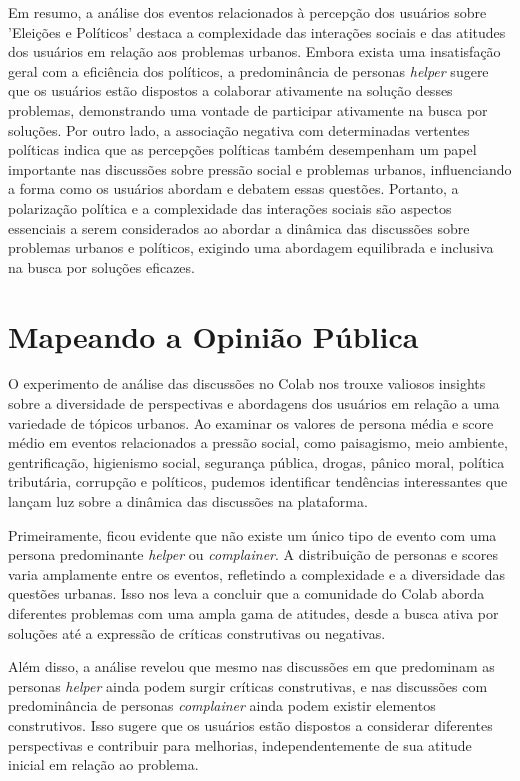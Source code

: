 Em resumo, a análise dos eventos relacionados à percepção dos usuários sobre 'Eleições e Políticos' destaca a complexidade das interações sociais e das atitudes dos usuários em relação aos problemas urbanos. Embora exista uma insatisfação geral com a eficiência dos políticos, a predominância de personas \textit{helper} sugere que os usuários estão dispostos a colaborar ativamente na solução desses problemas, demonstrando uma vontade de participar ativamente na busca por soluções. Por outro lado, a associação negativa com determinadas vertentes políticas indica que as percepções políticas também desempenham um papel importante nas discussões sobre pressão social e problemas urbanos, influenciando a forma como os usuários abordam e debatem essas questões. Portanto, a polarização política e a complexidade das interações sociais são aspectos essenciais a serem considerados ao abordar a dinâmica das discussões sobre problemas urbanos e políticos, exigindo uma abordagem equilibrada e inclusiva na busca por soluções eficazes.

\section{Mapeando a Opinião Pública}

O experimento de análise das discussões no Colab nos trouxe valiosos insights sobre a diversidade de perspectivas e abordagens dos usuários em relação a uma variedade de tópicos urbanos. Ao examinar os valores de persona média e score médio em eventos relacionados a pressão social, como paisagismo, meio ambiente, gentrificação, higienismo social, segurança pública, drogas, pânico moral, política tributária, corrupção e políticos, pudemos identificar tendências interessantes que lançam luz sobre a dinâmica das discussões na plataforma.

Primeiramente, ficou evidente que não existe um único tipo de evento com uma persona predominante \textit{helper} ou \textit{complainer}. A distribuição de personas e scores varia amplamente entre os eventos, refletindo a complexidade e a diversidade das questões urbanas. Isso nos leva a concluir que a comunidade do Colab aborda diferentes problemas com uma ampla gama de atitudes, desde a busca ativa por soluções até a expressão de críticas construtivas ou negativas.

Além disso, a análise revelou que mesmo nas discussões em que predominam as personas \textit{helper} ainda podem surgir críticas construtivas, e nas discussões com predominância de personas \textit{complainer} ainda podem existir elementos construtivos. Isso sugere que os usuários estão dispostos a considerar diferentes perspectivas e contribuir para melhorias, independentemente de sua atitude inicial em relação ao problema.

